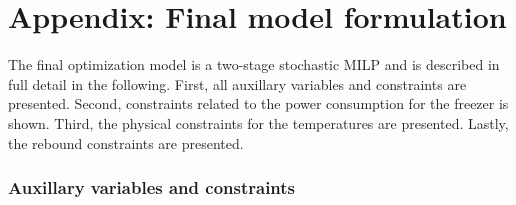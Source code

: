 {\appendices

\section*{Appendix: Final model formulation}\label{appendix:A}






\begingroup
\allowdisplaybreaks

The final optimization model is a two-stage stochastic MILP and is described in full detail in the following. First, all auxillary variables and constraints are presented. Second, constraints related to the power consumption for the freezer is shown. Third, the physical constraints for the temperatures are presented. Lastly, the rebound constraints are presented.


\subsubsection{Auxillary variables and constraints}\label{sec:aux_constraints}

}
